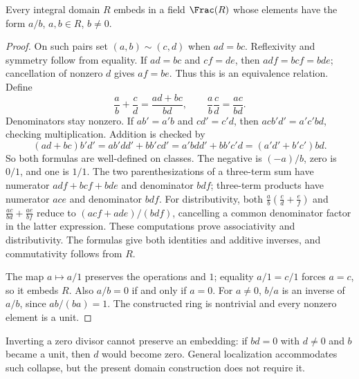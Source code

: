 \begin{theorem}\label{thm:fraction-field-construction}
Every integral domain $R$ embeds in a field $\Frac(R)$ whose elements
have the form $a/b$, $a,b\in R$, $b\ne0$.
\end{theorem}
\begin{proof}
On such pairs set $(a,b)\sim(c,d)$ when $ad=bc$.
Reflexivity and symmetry follow from equality. If $ad=bc$ and $cf=de$,
then $adf=bcf=bde$; cancellation of nonzero $d$ gives $af=be$.
Thus this is an equivalence relation. Define
\[
 \frac ab+\frac cd=\frac{ad+bc}{bd},\qquad
 \frac ab\frac cd=\frac{ac}{bd}.
\]
Denominators stay nonzero. If $ab'=a'b$ and $cd'=c'd$, then
$acb'd'=a'c'bd$, checking multiplication. Addition is checked by
\[
 (ad+bc)b'd'=ab'dd'+bb'cd'
 =a'bdd'+bb'c'd=(a'd'+b'c')bd.
\]
So both formulas are well-defined on classes.
The negative is $(-a)/b$, zero is $0/1$, and one is $1/1$.
The two parenthesizations of a three-term sum have numerator
$adf+bcf+bde$ and denominator $bdf$; three-term products have
numerator $ace$ and denominator $bdf$.
For distributivity, both
$\frac ab(\frac cd+\frac ef)$ and
$\frac{ac}{bd}+\frac{ae}{bf}$ reduce to
$(acf+ade)/(bdf)$, cancelling a common denominator factor in the latter
expression. These computations prove associativity and distributivity.
The formulas give both identities and additive inverses, and
commutativity follows from $R$.

The map $a\mapsto a/1$ preserves the operations and $1$; equality
$a/1=c/1$ forces $a=c$, so it embeds $R$.
Also $a/b=0$ if and only if $a=0$.
For $a\ne0$, $b/a$ is an inverse of $a/b$, since $ab/(ba)=1$.
The constructed ring is nontrivial and every nonzero element is a unit.
\end{proof}
Inverting a zero divisor cannot preserve an embedding: if $bd=0$ with
$d\ne0$ and $b$ became a unit, then $d$ would become zero.
General localization accommodates such collapse, but the present
domain construction does not require it.

